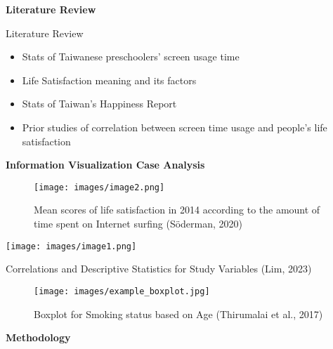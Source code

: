 \documentclass{beamer}
\begin{document}
\begin{frame}
    \centering
    \Huge\textbf{Literature Review}
\end{frame}

\begin{frame}{Literature Review}
    \begin{itemize}
        \item<+-> Stats of Taiwanese preschoolers’ screen usage time 
        \item<+-> Life Satisfaction meaning and its factors
        \item<+-> Stats of Taiwan’s Happiness Report
        \item<+-> Prior studies of correlation between screen time usage and people’s life satisfaction
    \end{itemize}
\end{frame}

\begin{frame}
    \centering
    \Huge\textbf{Information Visualization Case Analysis}
\end{frame}

\begin{frame}
    \begin{figure}[h]
        \centering
        \texttt{[image: images/image2.png]}
        \caption{Mean scores of life satisfaction in 2014 according to the amount of time spent on Internet surfing (Söderman, 2020)}
        \label{fig:line_chart}
    \end{figure}
\end{frame}

\begin{frame}
    \begin{table}[h]
        \centering
        \texttt{[image: images/image1.png]}
        \caption{Correlations and Descriptive Statistics for Study Variables (Lim, 2023)}
        \label{fig:line_chart}
    \end{table}
\end{frame}

\begin{frame}
    \begin{figure}[h]
        \centering
        \texttt{[image: images/example\_boxplot.jpg]}
        \caption{Boxplot for Smoking status based on Age (Thirumalai et al., 2017)}
        \label{fig:line_chart}
    \end{figure}
\end{frame}

\begin{frame}
    \centering
    \Huge\textbf{Methodology}
\end{frame}
\end{document}
